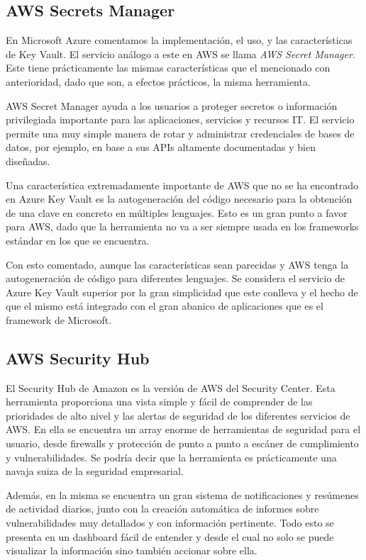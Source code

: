 \documentclass{article}
\begin{document}
\subsection*{AWS Secrets Manager}
En Microsoft Azure comentamos la implementación, el uso, y las características
de Key Vault. El servicio análogo a este en AWS se llama \textit{AWS Secret
Manager}. Este tiene prácticamente las mismas características que el mencionado
con anterioridad, dado que son, a efectos prácticos, la misma herramienta. 

AWS Secret Manager ayuda a los usuarios a proteger secretos o información
privilegiada importante para las aplicaciones, servicios y recursos IT. El
servicio permite una muy simple manera de rotar y administrar credenciales de
bases de datos, por ejemplo, en base a sus APIs altamente documentadas y bien
diseñadas.

Una característica extremadamente importante de AWS que no se ha encontrado en
Azure Key Vault es la autogeneración del código necesario para la obtención de
una clave en concreto en múltiples lenguajes. Esto es un gran punto a favor para
AWS, dado que la herramienta no va a ser siempre usada en los frameworks
estándar en los que se encuentra.

Con esto comentado, aunque las características sean parecidas y AWS tenga la
autogeneración de código para diferentes lenguajes. Se considera el servicio de
Azure Key Vault superior por la gran simplicidad que este conlleva y el hecho de
que el mismo está integrado con el gran abanico de aplicaciones que es el
framework de Microsoft.

\subsection*{AWS Security Hub}
El Security Hub de Amazon es la versión de AWS del Security Center. Esta
herramienta proporciona una vista simple y fácil de comprender de las
prioridades de alto nivel y las alertas de seguridad de los diferentes servicios
de AWS. En ella se encuentra un array enorme de herramientas de seguridad para
el usuario, desde firewalls y protección de punto a punto a escáner de
cumplimiento y vulnerabilidades. Se podría decir que la herramienta es
prácticamente una navaja suiza de la seguridad empresarial.

Además, en la misma se encuentra un gran sistema de notificaciones y resúmenes
de actividad diarios, junto con la creación automática de informes sobre
vulnerabilidades muy detallados y con información pertinente. Todo esto se
presenta en un dashboard fácil de entender y desde el cual no solo se puede
visualizar la información sino también accionar sobre ella. 
\end{document}
